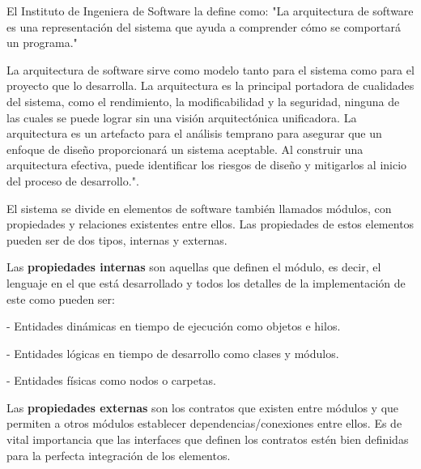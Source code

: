 \documentclass[12pt]{report} %
\begin{document}
	El Instituto de Ingeniera de Software la define como:
	"La arquitectura de software es una representación del sistema que ayuda a comprender cómo se comportará un programa."
	
	La arquitectura de software sirve como modelo tanto para el sistema como para el proyecto que lo desarrolla. La arquitectura es la principal portadora de cualidades del sistema, como el rendimiento, la modificabilidad y la seguridad, ninguna de las cuales se puede lograr sin una visión arquitectónica unificadora. La arquitectura es un artefacto para el análisis temprano para asegurar que un enfoque de diseño proporcionará un sistema aceptable. Al construir una arquitectura efectiva, puede identificar los riesgos de diseño y mitigarlos al inicio del proceso de desarrollo."\cite{SoftwareEngineeringInstitute}. 
	
	El sistema se divide en elementos de software también llamados módulos, con propiedades y relaciones existentes entre ellos. Las propiedades de estos elementos pueden ser de dos tipos, internas y externas.
	
	Las \textbf{propiedades internas}  son aquellas que definen el módulo, es decir, el lenguaje en el que está desarrollado y todos los detalles de la implementación de este como pueden ser:
	
	- Entidades dinámicas en tiempo de ejecución como objetos e hilos.
	
	- Entidades lógicas en tiempo de desarrollo como clases y módulos.
	
	- Entidades físicas como nodos o carpetas.	
	
	Las \textbf{propiedades externas} son los contratos que existen entre módulos y que permiten a otros módulos establecer dependencias/conexiones entre ellos. Es de vital importancia que las interfaces que definen los contratos estén bien definidas para la perfecta integración de los elementos.
	
\end{document}
